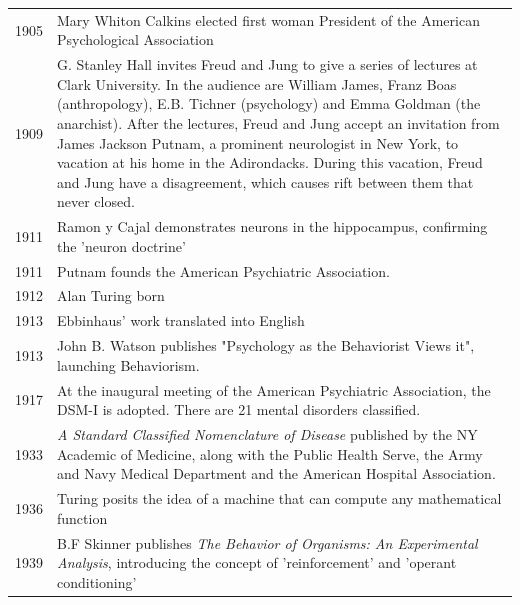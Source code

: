 \begin{refsection}
\begin{longtable}[!t]{ | P{2cm} | P{11.8cm} | }
1905&Mary Whiton Calkins elected first woman President of the American Psychological Association \\
1909&G. Stanley Hall invites Freud and Jung to give a series of lectures at Clark University.  In the audience are William James, Franz Boas (anthropology), E.B. Tichner (psychology) and Emma Goldman (the anarchist). After the lectures, Freud and Jung accept an invitation from James Jackson Putnam, a prominent neurologist in New York, to vacation at his home in the Adirondacks.  During this vacation, Freud and Jung have a disagreement, which causes rift between them that never closed.  \\
1911&Ramon y Cajal demonstrates neurons in the hippocampus, confirming the 'neuron doctrine' \\
1911&Putnam founds the American Psychiatric Association. \\
1912&Alan Turing born \\
1913&Ebbinhaus' work translated into English \\
1913&John B. Watson publishes "Psychology as the Behaviorist Views it", launching Behaviorism.   \\
1917&At the inaugural meeting of the American Psychiatric Association, the DSM-I is adopted.  There are 21 mental disorders classified.  \\
1933&\emph{A Standard Classified Nomenclature of Disease} published by the NY Academic of Medicine, along with the Public Health Serve, the Army and Navy Medical Department and the American Hospital Association.  \\
1936&Turing posits the idea of a machine that can compute any mathematical function \\
1939&B.F Skinner publishes \emph{The Behavior of Organisms: An Experimental Analysis}, introducing the concept of 'reinforcement' and 'operant conditioning'  \\


\end{longtable}
\end{refsection}
